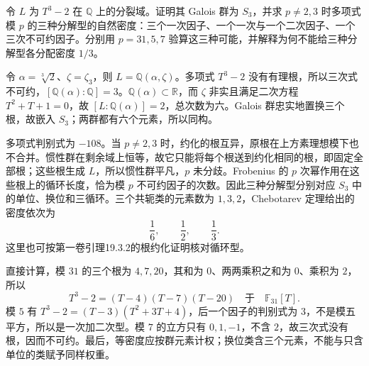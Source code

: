 \begin{optionalexercise}\label{b3:ex:A-s3-chebotarev-cycle-types}
	令 \(L\) 为 \(T^3-2\) 在 \(\mathbb Q\) 上的分裂域。证明其 Galois 群为 \(S_3\)，并求 \(p\ne2,3\) 时多项式模 \(p\) 的三种分解型的自然密度：三个一次因子、一个一次与一个二次因子、一个三次不可约因子。分别用 \(p=31,5,7\) 验算这三种可能，并解释为何不能给三种分解型各分配密度 \(1/3\)。
\end{optionalexercise}
\begin{solution}
	令 \(\alpha=\sqrt[3]2\)、\(\zeta=\zeta_3\)，则 \(L=\mathbb Q(\alpha,\zeta)\)。多项式 \(T^3-2\) 没有有理根，所以三次式不可约，\([\mathbb Q(\alpha):\mathbb Q]=3\)。\(\mathbb Q(\alpha)\subset\mathbb R\)，而 \(\zeta\) 非实且满足二次方程 \(T^2+T+1=0\)，故 \([L:\mathbb Q(\alpha)]=2\)，总次数为六。Galois 群忠实地置换三个根，故嵌入 \(S_3\)；两群都有六个元素，所以同构。

	多项式判别式为 \(-108\)。当 \(p\ne2,3\) 时，约化的根互异，原根在上方素理想模下也不合并。惯性群在剩余域上恒等，故它只能将每个根送到约化相同的根，即固定全部根；这些根生成 \(L\)，所以惯性群平凡，\(p\) 未分歧。Frobenius 的 \(p\) 次幂作用在这些根上的循环长度，恰为模 \(p\) 不可约因子的次数。因此三种分解型分别对应 \(S_3\) 中的单位、换位和三循环。三个共轭类的元素数为 \(1,3,2\)，Chebotarev 定理给出的密度依次为
	\[
		\dfrac16,\qquad\dfrac12,\qquad\dfrac13.
	\]
	这里也可按第一卷引理19.3.2的根约化证明核对循环型。

	直接计算，模 \(31\) 的三个根为 \(4,7,20\)，其和为 \(0\)、两两乘积之和为 \(0\)、乘积为 \(2\)，所以
	\[
		T^3-2=(T-4)(T-7)(T-20)\quad\text{于}\quad\mathbb F_{31}[T].
	\]
	模 \(5\) 有 \(T^3-2=(T-3)(T^2+3T+4)\)，后一个因子的判别式为 \(3\)，不是模五平方，所以是一次加二次型。模 \(7\) 的立方只有 \(0,1,-1\)，不含 \(2\)，故三次式没有根，因而不可约。最后，等密度应按群元素计权；换位类含三个元素，不能与只含单位的类赋予同样权重。
\end{solution}

